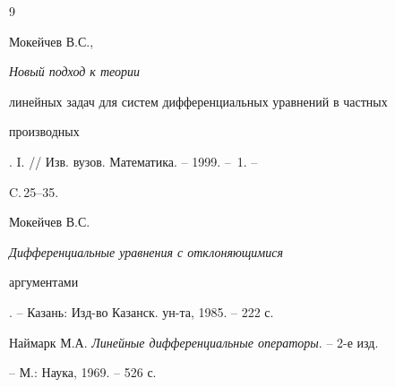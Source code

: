 \begin{thebibliography}{9} 


 




Мокейчев В.С.,  {\em Новый подход к теории 


линейных задач для систем дифференциальных уравнений в частных 


производных}. I. // Изв. вузов. Математика. -- 1999. -- \No\,1. -- 


C.\,25--35. 




Мокейчев В.С. {\em Дифференциальные уравнения с отклоняющимися 


аргументами}. -- Казань: Изд-во Казанск. ун-та, 1985. -- 222 с. 




Наймарк М.А. {\em Линейные дифференциальные операторы}. -- 2-е изд.


-- М.: Наука, 1969. -- 526 с. 


 


\end{thebibliography} 


 


\vskip 2cm 


 






 


\label{end} 


 


